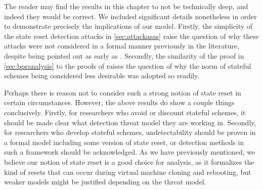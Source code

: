 The reader may find the results in this chapter to not be technically deep, and indeed they would be correct. We included significant details nonetheless in order to demonstrate precisely the implications of our model. Firstly, the simplicity of the state reset detection attacks in \autoref{sec:attackasas} raise the question of why these attacks were not considered in a formal manner previously in the literature, despite being pointed out as early as \cite{CCS:BelJaeKan15}. Secondly, the similarity of the proof in \autoref{sec:bpranalysis} to the proofs of \cite{CCS:BelJaeKan15} raises the question of why the norm of stateful schemes being considered less desirable was adopted so readily.

Perhaps there is reason not to consider such a strong notion of state reset in certain circumstances. However, the above results do show a couple things conclusively. Firstly, for researchers who avoid or discount stateful schemes, it should be made clear what detection threat model they are working in. Secondly, for researchers who develop stateful schemes, undetectability should be proven in a formal model including some version of state reset, or detection methods in such a framework should be acknowledged. As we have previously mentioned, we believe our notion of state reset is a good choice for analysis, as it formalizes the kind of resets that can occur during virtual machine cloning and rebooting, but weaker models might be justified depending on the threat model.
